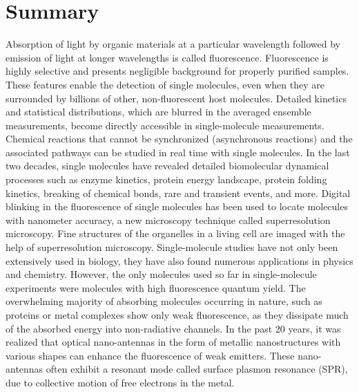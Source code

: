 \chapter*{Summary}
\label{ch:Summary}

Absorption of light by organic materials at a particular wavelength followed by emission of light at longer wavelengths is called fluorescence.
Fluorescence is highly selective and presents negligible background for properly purified samples. These features enable the detection of single molecules, even when they are surrounded by billions of other, non-fluorescent host molecules.
Detailed kinetics and statistical distributions, which are blurred in the averaged ensemble measurements, become directly accessible in single-molecule measurements.
Chemical reactions that cannot be synchronized (asynchronous reactions) and the associated pathways can be studied in real time with single molecules.
In the last two decades, single molecules have revealed detailed biomolecular dynamical processes such as enzyme kinetics, protein energy landscape, protein folding kinetics, breaking of chemical bonds, rare and transient events, and more.
Digital blinking in the fluorescence of single molecules has been used to locate molecules with nanometer accuracy, a new microscopy technique called superresolution microscopy.
Fine structures of the organelles in a living cell are imaged with the help of superresolution microscopy.
Single-molecule studies have not only been extensively used in biology, they have also found numerous applications in physics and chemistry.
However, the only molecules used so far in single-molecule experiments were molecules with high fluorescence quantum yield.
The overwhelming majority of absorbing molecules occurring in nature, such as proteins or metal complexes show only weak fluorescence, as they dissipate much of the absorbed energy into non-radiative channels.
In the past 20 years, it was realized that optical nano-antennas in the form of metallic nanostructures with various shapes can enhance the fluorescence of weak emitters.
These nano-antennas often exhibit a resonant mode called surface plasmon resonance (SPR), due to collective motion of free electrons in the metal.
